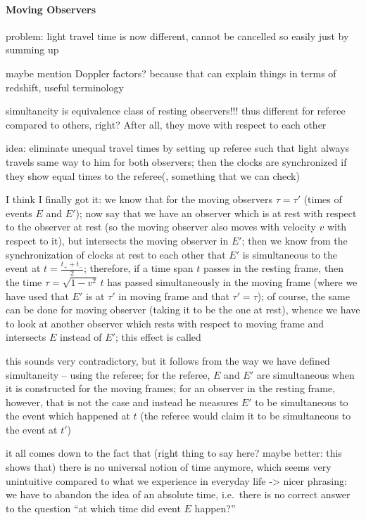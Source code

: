 \fi




			\paragraph{Moving Observers}
problem: light travel time is now different, cannot be cancelled so easily just by summing up


maybe mention Doppler factors? because that can explain things in terms of redshift, useful terminology


simultaneity is equivalence class of resting observers!!! thus different for referee compared to others, right? After all, they move with respect to each other

idea: eliminate unequal travel times by setting up referee such that light always travels same way to him for both observers; then the clocks are synchronized if they show equal times to the referee(, something that we can check)


I think I finally got it: we know that for the moving observers $\tau = \tau'$ (times of events $E$ and $E'$); now say that we have an observer which is at rest with respect to the observer at rest (so the moving observer also moves with velocity $v$ with respect to it), but intersects the moving observer in $E'$; then we know from the synchronization of clocks at rest to each other that $E'$ is simultaneous to the event at $t = \frac{t_+ + t_-}{2}$; therefore, if a time span $t$ passes in the resting frame, then the time $\tau = \sqrt{1 - v^2} \, t$ has passed simultaneously in the moving frame (where we have used that $E'$ is at $\tau'$ in moving frame and that $\tau' = \tau$); of course, the same can be done for moving observer (taking it to be the one at rest), whence we have to look at another observer which rests with respect to moving frame and intersects $E$ instead of $E'$; this effect is called 

this sounds very contradictory, but it follows from the way we have defined simultaneity -- using the referee; for the referee, $E$ and $E'$ are simultaneous when it is constructed for the moving frames; for an observer in the resting frame, however, that is not the case and instead he measures $E'$ to be simultaneous to the event which happened at $t$ (the referee would claim it to be simultaneous to the event at $t'$)



it all comes down to the fact that (right thing to say here? maybe better: this shows that) there is no universal notion of time anymore, which seems very unintuitive compared to what we experience in everyday life -> nicer phrasing: we have to abandon the idea of an absolute time, i.e.~there is no correct answer to the question \enquote{at which time did event $E$ happen?}


